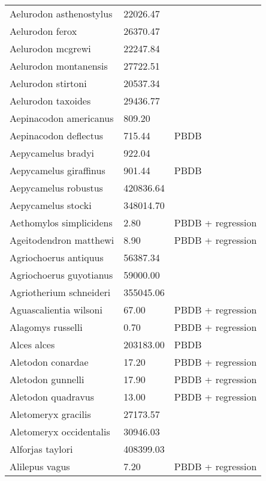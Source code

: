 \begin{longtable}{p{} p{} p{}}
    Aelurodon asthenostylus & 22026.47 & \cite{Tomiya2013} \\ 
    Aelurodon ferox & 26370.47 & \cite{Tomiya2013} \\ 
    Aelurodon mcgrewi & 22247.84 & \cite{Tomiya2013} \\ 
    Aelurodon montanensis & 27722.51 & \cite{Tomiya2013} \\ 
    Aelurodon stirtoni & 20537.34 & \cite{Tomiya2013} \\ 
    Aelurodon taxoides & 29436.77 & \cite{Tomiya2013} \\ 
    Aepinacodon americanus & 809.20 & \cite{Baskin2011} \\ 
    Aepinacodon deflectus & 715.44 & PBDB \\ 
    Aepycamelus bradyi & 922.04 & \cite{Dawson2012} \\ 
    Aepycamelus giraffinus & 901.44 & PBDB \\ 
    Aepycamelus robustus & 420836.64 & \cite{Tomiya2013} \\ 
    Aepycamelus stocki & 348014.70 & \cite{Tomiya2013} \\ 
    Aethomylos simplicidens & 2.80 & PBDB + regression \\ 
    Ageitodendron matthewi & 8.90 & PBDB + regression \\ 
    Agriochoerus antiquus & 56387.34 & \cite{Tomiya2013} \\ 
    Agriochoerus guyotianus & 59000.00 & \cite{McKenna2011} \\ 
    Agriotherium schneideri & 355045.06 & \cite{Tomiya2013} \\ 
    Aguascalientia wilsoni & 67.00 & PBDB + regression \\ 
    Alagomys russelli & 0.70 & PBDB + regression \\ 
    Alces alces & 203183.00 & PBDB \\ 
    Aletodon conardae & 17.20 & PBDB + regression \\ 
    Aletodon gunnelli & 17.90 & PBDB + regression \\ 
    Aletodon quadravus & 13.00 & PBDB + regression \\ 
    Aletomeryx gracilis & 27173.57 & \cite{Tomiya2013} \\ 
    Aletomeryx occidentalis & 30946.03 & \cite{Tomiya2013} \\ 
    Alforjas taylori & 408399.03 & \cite{Tomiya2013} \\ 
    Alilepus vagus & 7.20 & PBDB + regression \\ 

\end{longtable}
